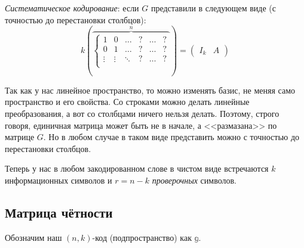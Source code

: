 \begin{Def}
	\textit{Систематическое кодирование}:
	если $G$ представили в следующем виде (с точностью до перестановки столбцов):
	\[
	k
	\left(
	\overbrace{
	\left\{
	\begin{array}{ccc|ccc}
		1 & 0 & \dots & ? & \dots & ? \\
		0 & 1 & \dots & ? & \dots & ? \\
		\vdots & \vdots & \ddots & ? & \dots & ? \\
	\end{array}
	\right.
	}^{n}
	\right)
	=
	\left(
	\begin{array}{c|c}I_k & A\end{array}
	\right)
	\]
\end{Def}
\begin{Rem}
	Так как у нас линейное пространство, то можно изменять базис,
	не меняя само пространство и его свойства.
	Со строками можно делать линейные преобразования,
	а вот со столбцами ничего нельзя делать.
	Поэтому, строго говоря, единичная матрица может быть не в начале,
	а <<размазана>> по матрице $G$.
	Но в любом случае в таком виде представить можно с точностью до перестановки столбцов.
\end{Rem}
\begin{Def}
	Теперь у нас в любом закодированном слове
	в чистом виде встречаются $k$ информационных символов
	и $r=n-k$ \textit{проверочных} символов.
\end{Def}

\subsection{Матрица чётности}
Обозначим наш $(n, k)$-код (подпространство) как $\mathbb g$.

